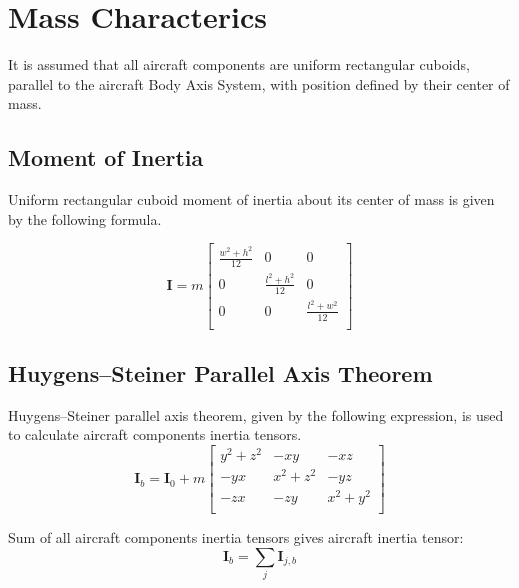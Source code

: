 \chapter{Mass Characterics}

It is assumed that all aircraft components are uniform rectangular cuboids, parallel to the aircraft Body Axis System, with position defined by their center of mass.

\section{Moment of Inertia}

Uniform rectangular cuboid moment of inertia about its center of mass is given by the following formula. \cite{Awrejcewicz2012}

\begin{equation}
  \label{eq-cuboid-inertia}
  {\boldsymbol I}
  =
  m
  \left[
    \begin{matrix}
      \frac{w^2 + h^2}{12} & 0 & 0 \\
      0 & \frac{l^2 + h^2}{12} & 0 \\
      0 & 0 & \frac{l^2 + w^2}{12} \\
    \end{matrix}
  \right]
\end{equation}

\section{Huygens–Steiner Parallel Axis Theorem}

Huygens–Steiner parallel axis theorem, given by the following expression, is used to calculate aircraft components inertia tensors. \cite{Awrejcewicz2012}
\begin{equation}
  \label{eq-mass-steiners}
  {\boldsymbol I}_b
  =
  {\boldsymbol I}_0
  +
  m
  \left[
    \begin{matrix}
      y^2 + z^2 &       -xy &       -xz \\
            -yx & x^2 + z^2 &       -yz \\
            -zx &       -zy & x^2 + y^2 \\
    \end{matrix}
  \right]
\end{equation}

Sum of all aircraft components inertia tensors gives aircraft inertia tensor:
\begin{equation}
  {\boldsymbol I}_b = \sum_{j} {\boldsymbol I}_{j,b}
\end{equation}

